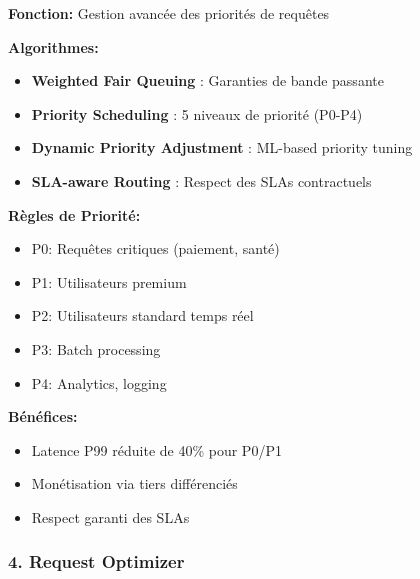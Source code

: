 \documentclass[12pt,a4paper]{article}
\begin{document}
\begin{tcolorbox}[colback=green!5,colframe=green!50!black,title=\textbf{Nouveau Composant: Intelligent Priority Queue}]

\textbf{Fonction:} Gestion avancée des priorités de requêtes

\textbf{Algorithmes:}
\begin{itemize}[noitemsep]
    \item \textbf{Weighted Fair Queuing} : Garanties de bande passante
    \item \textbf{Priority Scheduling} : 5 niveaux de priorité (P0-P4)
    \item \textbf{Dynamic Priority Adjustment} : ML-based priority tuning
    \item \textbf{SLA-aware Routing} : Respect des SLAs contractuels
\end{itemize}

\textbf{Règles de Priorité:}
\begin{itemize}[noitemsep]
    \item P0: Requêtes critiques (paiement, santé)
    \item P1: Utilisateurs premium
    \item P2: Utilisateurs standard temps réel
    \item P3: Batch processing
    \item P4: Analytics, logging
\end{itemize}

\textbf{Bénéfices:}
\begin{itemize}[noitemsep]
    \item Latence P99 réduite de 40\% pour P0/P1
    \item Monétisation via tiers différenciés
    \item Respect garanti des SLAs
\end{itemize}
\end{tcolorbox}

\subsubsection{4. Request Optimizer}
\end{document}
